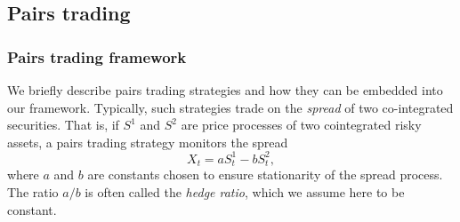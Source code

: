 \documentclass{article}
\theoremstyle{plain}
\theoremstyle{definition}
\newcommand{\R}{\mathbb{R}}
\numberwithin{lem}{section}
\begin{document}

\subsection{Pairs trading}
\label{sec:pairs_trading}

\subsubsection{Pairs trading framework} \label{sec:pairs_trading_framework}
We briefly describe pairs trading strategies and how they can be embedded into our framework. Typically, such strategies trade on the \emph{spread} of two co-integrated securities. That is, if $S^1$ and $S^2$ are price processes of two cointegrated risky assets, a pairs trading strategy monitors the spread 
\begin{equation} \label{eqn:spread}
    X_t = aS^1_t - bS^2_t,
\end{equation} where $a$ and $b$ are constants chosen to ensure stationarity of the spread process. The ratio $a/b$ is often called the \emph{hedge ratio}, which we assume here to be constant. 
\end{document}
